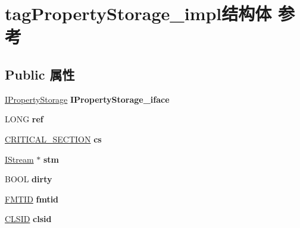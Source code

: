 \hypertarget{structtag_property_storage__impl}{}\section{tag\+Property\+Storage\+\_\+impl结构体 参考}
\label{structtag_property_storage__impl}
\subsection*{Public 属性}
\begin{DoxyCompactItemize}
\item 
\mbox{\label{structtag_property_storage__impl_a11ea6a8442ddb29b6cd6332b4af94882}} 
\hyperlink{interface_i_property_storage}{I\+Property\+Storage} {\bfseries I\+Property\+Storage\+\_\+iface}
\item 
\mbox{\label{structtag_property_storage__impl_ac31f2691d03776ed1553de3062bda023}} 
L\+O\+NG {\bfseries ref}
\item 
\mbox{\label{structtag_property_storage__impl_aad51474485128cac786b2984512d68ae}} 
\hyperlink{struct___c_r_i_t_i_c_a_l___s_e_c_t_i_o_n}{C\+R\+I\+T\+I\+C\+A\+L\+\_\+\+S\+E\+C\+T\+I\+ON} {\bfseries cs}
\item 
\mbox{\label{structtag_property_storage__impl_a0df8a7ae9911beb973d45728eb65e4fd}} 
\hyperlink{interface_i_stream}{I\+Stream} $\ast$ {\bfseries stm}
\item 
\mbox{\label{structtag_property_storage__impl_a57f95a41f4420cfd384766885318049a}} 
B\+O\+OL {\bfseries dirty}
\item 
\mbox{\label{structtag_property_storage__impl_ac7ec0e3d43bd7aa5387fd703aac9edb9}} 
\hyperlink{interface_g_u_i_d}{F\+M\+T\+ID} {\bfseries fmtid}
\item 
\mbox{\label{structtag_property_storage__impl_a3885d890be02f30ca7814c2ed8169162}} 
\hyperlink{struct___i_i_d}{C\+L\+S\+ID} {\bfseries clsid}
\item 

\end{DoxyCompactItemize}
